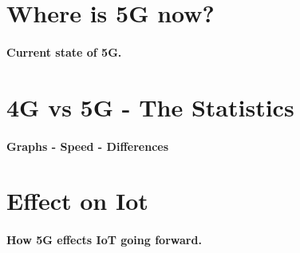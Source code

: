 \section{Where is 5G now?}
\paragraph{Current state of 5G.}

\section{4G vs 5G - The Statistics}
\paragraph{Graphs - Speed - Differences}

\section{Effect on Iot}
\paragraph{How 5G effects IoT going forward. }